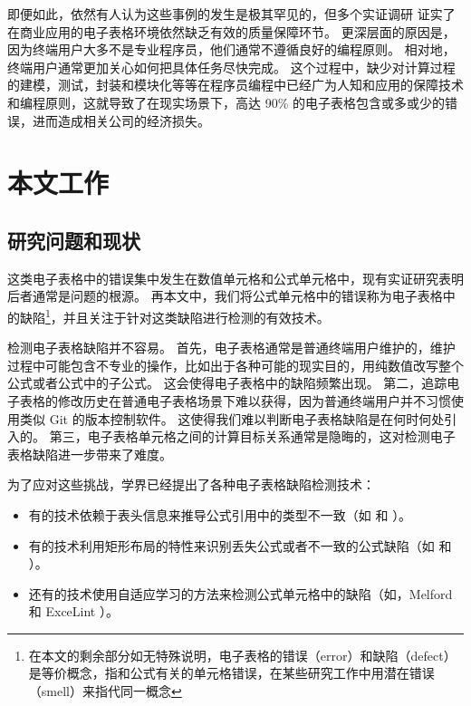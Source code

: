即便如此，依然有人认为这些事例的发生是极其罕见的，但多个实证调研 \cite{panko2016we,powell2009impact} 证实了在商业应用的电子表格环境依然缺乏有效的质量保障环节。
更深层面的原因是，因为终端用户大多不是专业程序员，他们通常不遵循良好的编程原则。
相对地，终端用户通常更加关心如何把具体任务尽快完成。
这个过程中，缺少对计算过程的建模，测试，封装和模块化等等在程序员编程中已经广为人知和应用的保障技术和编程原则，这就导致了在现实场景下，高达 90\% 的电子表格包含或多或少的错误\cite{rajalingham2008classification}，进而造成相关公司的经济损失。


\section{本文工作}

\subsection{研究问题和现状}

这类电子表格中的错误集中发生在数值单元格和公式单元格中，现有实证研究\cite{panko2010revising}表明后者通常是问题的根源。
再本文中，我们将公式单元格中的错误称为电子表格中的缺陷\footnote{在本文的剩余部分如无特殊说明，电子表格的错误（error）和缺陷（defect）是等价概念，指和公式有关的单元格错误，在某些研究工作中用潜在错误（smell）来指代同一概念}，并且关注于针对这类缺陷进行检测的有效技术。


检测电子表格缺陷并不容易。
首先，电子表格通常是普通终端用户维护的，维护过程中可能包含不专业的操作，比如出于各种可能的现实目的，用纯数值改写整个公式或者公式中的子公式。
这会使得电子表格中的缺陷频繁出现。
第二，追踪电子表格的修改历史在普通电子表格场景下难以获得，因为普通终端用户并不习惯使用类似 Git 的版本控制软件。
这使得我们难以判断电子表格缺陷是在何时何处引入的。
第三，电子表格单元格之间的计算目标关系通常是隐晦的，这对检测电子表格缺陷进一步带来了难度。

为了应对这些挑战，学界已经提出了各种电子表格缺陷检测技术：

\begin{itemize}
    \item 有的技术依赖于表头信息来推导公式引用中的类型不一致（如\uc \cite{abraham2007ucheck} 和 \di \cite{chambers2009automatic}）。
    \item 有的技术利用矩形布局的特性来识别丢失公式或者不一致的公式缺陷（如\am \cite{dou2014spreadsheet} 和 \ca \cite{dou2017cacheck}）。
    \item 还有的技术使用自适应学习的方法来检测公式单元格中的缺陷（如\cu \cite{cheung2016custodes}，Melford\cite{singh2017melford} 和 ExceLint \cite{Barowy2018excelint}）。
\end{itemize}

